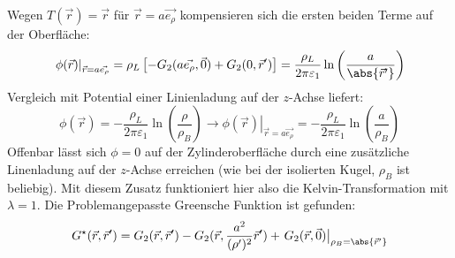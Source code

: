 		  	 Wegen $T(\vec{r} )=\vec{r} $ für $\vec{r}  =a\vec{e_\rho} $ kompensieren sich die ersten beiden Terme auf der Oberfläche:
		  	\begin{equation}
		  		\left.\phi(\vec{r} )\right|_{\vec{r}  =a\vec{e_\rho}} = \rho_L \left[ - G_2(a\vec{e_\rho}, \vec{0}) + G_2(0, \vec{r}' )\right] = \frac{\rho_L}{2\pi\varepsilon_1} \ln\left(\frac{a}{\abs{\vec{r}' }} \right)
		  	\end{equation}
		  	 Vergleich mit Potential einer Linienladung auf der $z$-Achse liefert:
		  	\begin{equation}
		  		\phi(\vec{r} ) = -\frac{\rho_L}{2\pi\varepsilon_1} \ln\left(\frac{\rho}{\rho_B} \right) \rightarrow \left.\phi(\vec{r} )\right|_{\vec{r}  =a\vec{e_\rho}} = -\frac{\rho_L}{2\pi\varepsilon_1} \ln\left(\frac{a}{\rho_B} \right)
		  	\end{equation}
		  	 Offenbar lässt sich $\phi =0$ auf der Zylinderoberfläche durch eine zusätzliche Linenladung auf der $z$-Achse erreichen (wie bei der isolierten Kugel, $\rho_B$ ist beliebig). Mit diesem Zusatz funktioniert hier also die Kelvin-Transformation mit $\lambda = 1$. Die Problemangepasste Greensche Funktion ist gefunden:
		  	\begin{equation}
		  		G^\star (\vec{r} , \vec{r}' ) = G_2(\vec{r} , \vec{r}' ) - G_2(\vec{r} , \frac{a^2}{(\rho')^2}\vec{r}'  )+ \left.G_2(\vec{r} , \vec{0})\right|_{\rho_B = \abs{\vec{r}' }}
		  	\end{equation}
